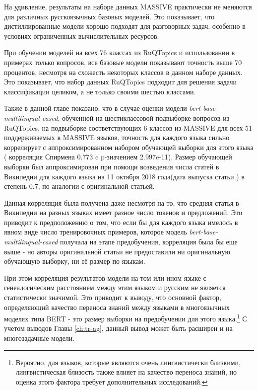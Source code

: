 На удивление, результаты на наборе данных {MASSIVE} практически не меняются для различных русскоязычных базовых моделей. Это показывает, что дистиллированные модели хорошо подходят для разговорных задач, особенно в условиях ограниченных вычислительных ресурсов.

При обучении моделей на всех 76 классах из {RuQTopics} и использовании в примерах только вопросов, все базовые модели показывают точность выше 70 процентов, несмотря на схожесть некоторых классов в данном наборе данных. Это показывает, что набор данных {RuQTopics} подходит для решения задачи классификации целиком, а не только своими шестью классами.

Также в данной главе показано, что в случае оценки модели  \textit{bert-base-multilingual-cased}, обученной на шестиклассовой подвыборке вопросов из {RuQTopics}, на подвыборке соответствующих 6 классов из {MASSIVE} для всех 51 поддерживаемых в {MASSIVE} языков, точность для каждого языка сильно коррелирует с аппроксимированном набором обучающей выборки для этого языка ( корреляция Спирмена 0.773 c p-значением 2.997e-11). Размер обучающей выборки был аппроксимирован при помощи возведения числа статей в Википедии для каждого языка на 11 октября 2018 года(дата выпуска статьи \cite{bert}) в степень 0.7, по аналогии с оригинальной статьей.

Данная корреляция была получена даже несмотря на то, что средняя статья в Википедии на разных языках имеет разное число токенов и предложений. Это приводит к предположению о том, что если бы для каждого языка имелось в явном виде число тренировочных примеров, которое модель \textit{bert-base-multilingual-cased} получала на этапе предобучения, корреляция была бы еще выше - но авторы оригинальной статьи не предоставили ни оригинальную обучающую выборку, ни её размер по языкам. 

При этом корреляция результатов модели на том или ином языке с генеалогическим расстоянием между этим языком и русским не является статистически значимой. Это приводит к выводу, что основной фактор, определяющий качество переноса знаний между языками в многоязычных моделях типа BERT - это размер выборки на предобучении для этого языка.\footnote{Вероятно, для языков, которые являются очень лингвистически близкими, лингвистическая близость также влияет на качество переноса знаний, но оценка этого фактора требует дополнительных исследований.} С учетом выводов Главы \ref{ch:tr-ag}, данный вывод может быть расширен и на многозадачные модели.

